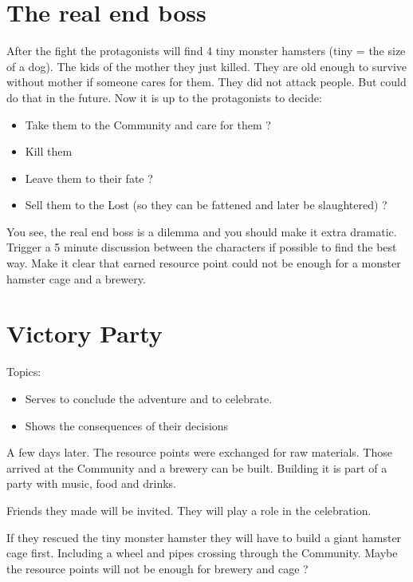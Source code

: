 \section{The real end boss}

After the fight the protagonists will find 4 tiny monster hamsters (tiny = the size of a dog). The kids of the mother they just killed. They are old enough to survive without mother if someone cares for them. They did not attack people. But could do that in the future. Now it is up to the protagonists to decide:

\begin{itemize}
    \item Take them to the Community and care for them ?
    \item Kill them
    \item Leave them to their fate ?
    \item Sell them to the Lost (so they can be fattened and later be slaughtered) ?
\end{itemize}

You see, the real end boss is a dilemma and you should make it extra dramatic. Trigger a 5 minute discussion between the characters if possible to find the best way. Make it clear that earned resource point could not be enough for a monster hamster cage and a brewery.

\section{Victory Party}

Topics:

\begin{itemize}
\item Serves to conclude the adventure and to celebrate.
\item Shows the consequences of their decisions
\end{itemize}

A few days later. The resource points were exchanged for raw materials. Those arrived at the Community and a brewery can be built. Building it is part of a party with music, food and drinks.

Friends they made will be invited. They will play a role in the celebration.

If they rescued the tiny monster hamster they will have to build a giant hamster cage first. Including a wheel and pipes crossing through the Community. Maybe the resource points will not be enough for brewery and cage ?

